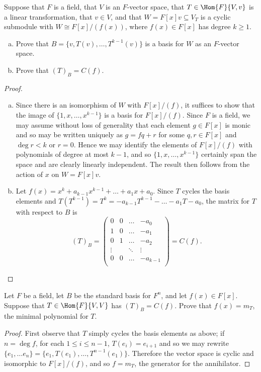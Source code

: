 \documentclass[10pt]{amsart}
\begin{document}
\begin{thm}
  Suppose that $F$ is a field, that $V$ is an $F$-vector space, that $T \in \Hom{F}{V, v}$ is a linear transformation, that $v \in V$, and that $W = F[x]v \subseteq V_T$ is a cyclic submodule with $W \cong F[x] / (f(x))$, where $f(x) \in F[x]$ has degree $k \geq 1$.
  \begin{enumerate}[(a)]
  \item
    Prove that $B = \{v, T(v), \ldots, T^{k-1}(v)\}$ is a basis for $W$ as an $F$-vector space.
  \item
    Prove that $(T)_B = C(f)$.
  \end{enumerate}
  \begin{proof}
    \begin{enumerate}[(a)]
    \item
      Since there is an isomorphism of $W$ with $F[x]/(f)$, it suffices to show that the image of $\{1, x, \ldots, x^{k-1}\}$ is a basis for $F[x]/(f)$.
      Since $F$ is a field, we may assume without loss of generality that each element $g \in F[x]$ is monic and so may be written uniquely as $g = fq + r$ for some $q,r \in F[x]$ and $\deg{r} < k$ or $r = 0$.
      Hence we may identify the elements of $F[x]/(f)$ with polynomials of degree at most $k-1$, and so $\{1, x, \ldots, x^{k-1}\}$ certainly span the space and are clearly linearly independent.
      The result then follows from the action of $x$ on $W = F[x]v$.
    \item
      Let $f(x) = x^k + a_{k-1}x^{k-1} + \ldots + a_1x + a_0$.
      Since $T$ cycles the basis elements and $T(T^{k-1}) = T^k = - a_{k-1}T^{k-1} - \ldots - a_1T - a_0$, the matrix for $T$ with respect to $B$ is
      $$(T)_B = \left(\begin{array}{cccc}
        0 & 0 & \ldots &-a_0\\
        1 & 0 & \ldots &-a_1\\
        0 & 1 & \ldots &-a_2\\
        \vdots& & \ddots &\vdots\\
        0 & 0 & \ldots & -a_{k-1}\\
      \end{array}\right) = C(f).$$
  \end{enumerate}
  \end{proof}
\end{thm}  

\begin{thm}
  Let $F$ be a field, let $B$ be the standard basis for $F^n$, and let $f(x) \in F[x]$.
  Suppose that $T \in \Hom{F}{V,V}$ has $(T)_B = C(f)$.
  Prove that $f(x) = m_T$, the minimal polynomial for $T$.
  
  \begin{proof}
    First observe that $T$ simply cycles the basis elements as above; if $n = \deg{f}$, for each $1 \leq i \leq n-1$, $T(e_i) = e_{i+1}$ and so we may rewrite $\{e_1, \ldots e_n\} = \{e_1, T(e_1), \ldots, T^{n-1}(e_1)\}$.
    Therefore the vector space is cyclic and isomorphic to $F[x]/(f)$, and so $f = m_T$, the generator for the annihilator.
  \end{proof}
\end{thm}  
\end{document}

